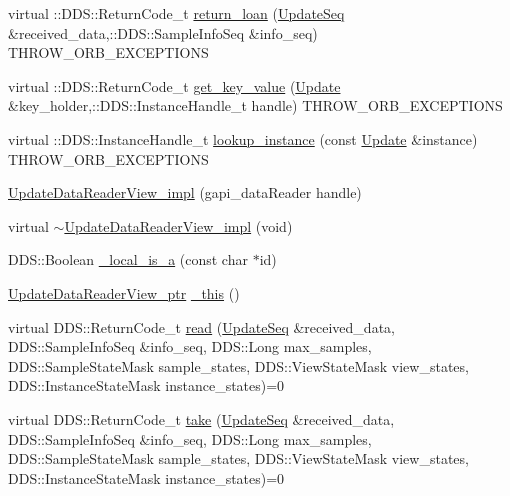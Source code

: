 \begin{DoxyCompactItemize}
virtual ::DDS::ReturnCode\_\-t \hyperlink{classKnowledge_1_1UpdateDataReaderView__impl_a4bfc8fe093ea55a2e1906a2561bc86f0}{return\_\-loan} (\hyperlink{namespaceKnowledge_ab62e46316b954f0d249e0e45de7059dc}{UpdateSeq} \&received\_\-data,::DDS::SampleInfoSeq \&info\_\-seq) THROW\_\-ORB\_\-EXCEPTIONS
\item 
virtual ::DDS::ReturnCode\_\-t \hyperlink{classKnowledge_1_1UpdateDataReaderView__impl_a4db4be3cf8301ba5b0e17c0d351abccb}{get\_\-key\_\-value} (\hyperlink{structKnowledge_1_1Update}{Update} \&key\_\-holder,::DDS::InstanceHandle\_\-t handle) THROW\_\-ORB\_\-EXCEPTIONS
\item 
virtual ::DDS::InstanceHandle\_\-t \hyperlink{classKnowledge_1_1UpdateDataReaderView__impl_af3908bb69b76715c4231ab3702387390}{lookup\_\-instance} (const \hyperlink{structKnowledge_1_1Update}{Update} \&instance) THROW\_\-ORB\_\-EXCEPTIONS
\item 
\hyperlink{classKnowledge_1_1UpdateDataReaderView__impl_adcfdc9e44ae8f3c24e3eb9f0e1670926}{UpdateDataReaderView\_\-impl} (gapi\_\-dataReader handle)
\item 
virtual \hyperlink{classKnowledge_1_1UpdateDataReaderView__impl_a5ecba15d974f9352f4a6b496774e81a7}{$\sim$UpdateDataReaderView\_\-impl} (void)
\item 
DDS::Boolean \hyperlink{classKnowledge_1_1UpdateDataReaderView_a7a3d481821f1d00dbfb5e269f7746c3b}{\_\-local\_\-is\_\-a} (const char $\ast$id)
\item 
\hyperlink{classKnowledge_1_1UpdateDataReaderView}{UpdateDataReaderView\_\-ptr} \hyperlink{classKnowledge_1_1UpdateDataReaderView_adc4038812e92634b62356e2f08eaada3}{\_\-this} ()
\item 
virtual DDS::ReturnCode\_\-t \hyperlink{classKnowledge_1_1UpdateDataReaderView_a80ac22448a45129f96f88ed14973ef32}{read} (\hyperlink{namespaceKnowledge_ab62e46316b954f0d249e0e45de7059dc}{UpdateSeq} \&received\_\-data, DDS::SampleInfoSeq \&info\_\-seq, DDS::Long max\_\-samples, DDS::SampleStateMask sample\_\-states, DDS::ViewStateMask view\_\-states, DDS::InstanceStateMask instance\_\-states)=0
\item 
virtual DDS::ReturnCode\_\-t \hyperlink{classKnowledge_1_1UpdateDataReaderView_a80c892210ddec9bdd7f61daae5f576ae}{take} (\hyperlink{namespaceKnowledge_ab62e46316b954f0d249e0e45de7059dc}{UpdateSeq} \&received\_\-data, DDS::SampleInfoSeq \&info\_\-seq, DDS::Long max\_\-samples, DDS::SampleStateMask sample\_\-states, DDS::ViewStateMask view\_\-states, DDS::InstanceStateMask instance\_\-states)=0
\item 

\end{DoxyCompactItemize}
